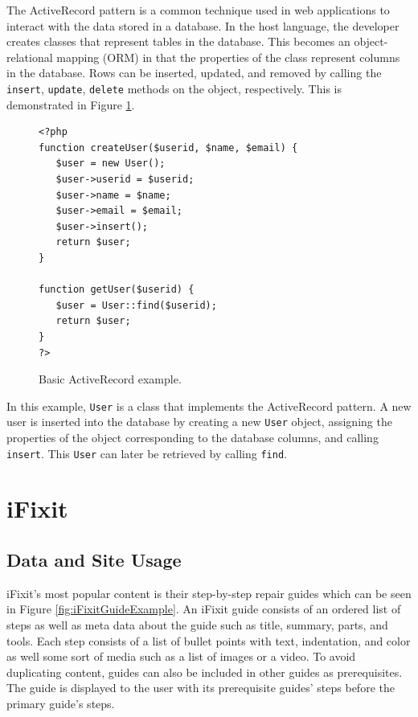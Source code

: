 \documentclass[12pt]{ucthesis}
\begin{document}
The ActiveRecord pattern is a common technique used in web applications to interact with the data stored in a database.
In the host language, the developer creates classes that represent tables in the database.
This becomes an object-relational mapping (ORM) in that the properties of the class represent columns in the database.
Rows can be inserted, updated, and removed by calling the {\tt insert}, {\tt update}, {\tt delete} methods on the object, respectively.
This is demonstrated in Figure \ref{fig:activeRecordExample}.

\begin{figure}[h]
\begin{ssp}
\begin{verbatim}
<?php
function createUser($userid, $name, $email) {
   $user = new User();
   $user->userid = $userid;
   $user->name = $name;
   $user->email = $email;
   $user->insert();
   return $user;
}

function getUser($userid) {
   $user = User::find($userid);
   return $user;
}
?>
\end{verbatim}
\end{ssp}
\caption{Basic ActiveRecord example.}
\label{fig:activeRecordExample}
\end{figure}

In this example, {\tt User} is a class that implements the ActiveRecord pattern.
A new user is inserted into the database by creating a new {\tt User} object, assigning the properties of the object corresponding to the database columns, and calling {\tt insert}.
This {\tt User} can later be retrieved by calling {\tt find}.


\section{iFixit}

\subsection{Data and Site Usage}
\textsf{iFixit}'s most popular content is their step-by-step repair guides which can be seen in Figure \ref{fig:iFixitGuideExample}.
An \textsf{iFixit} guide consists of an ordered list of steps as well as meta data about the guide such as title, summary, parts, and tools.
Each step consists of a list of bullet points with text, indentation, and color as well some sort of media such as a list of images or a video.
To avoid duplicating content, guides can also be included in other guides as prerequisites.
The guide is displayed to the user with its prerequisite guides' steps before the primary guide's steps.
\end{document}
